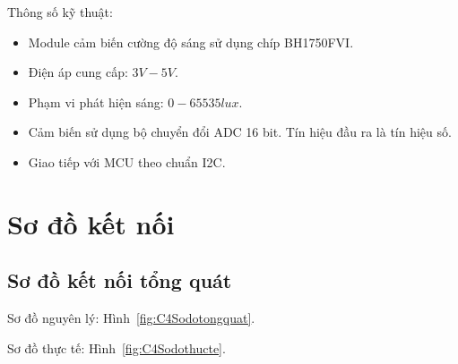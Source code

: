 Thông số kỹ thuật:
\begin{itemize}
\item Module cảm biến cường độ sáng sử dụng chíp BH1750FVI.
\item Điện áp cung cấp: $ 3V - 5V $.
\item Phạm vi phát hiện sáng: $ 0 - 65535 lux $.
\item Cảm biến sử dụng bộ chuyển đổi ADC 16 bit. Tín hiệu đầu ra là tín hiệu số.
\item Giao tiếp với MCU theo chuẩn I2C.
\end{itemize}

\section{Sơ đồ kết nối}

\subsection{Sơ đồ kết nối tổng quát}
Sơ đồ nguyên lý: Hình~\ref{fig:C4Sodotongquat}.

Sơ đồ thực tế: Hình~\ref{fig:C4Sodothucte}.

